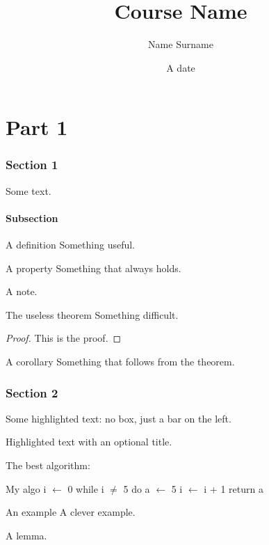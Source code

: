 \documentclass[11pt,a4paper,oneside,openany]{scrbook}
\title{\Huge Course Name}
\author{Name Surname}
\date{A date} %
\begin{document}
\maketitle
\tableofcontents
\clearpage

\part{Part 1}

\section{Section 1}

Some text.

\subsection{Subsection}

\begin{definizione}{A definition}
Something useful.
\end{definizione}

\begin{proprieta}{A property}
Something that always holds.
\end{proprieta}

\begin{nota}
A note.
\end{nota}

\begin{teorema}{The useless theorem}
Something difficult.
\begin{proof}
This is the proof.
\end{proof}

\end{teorema}

\begin{corollario}{A corollary}
Something that follows from the theorem.
\end{corollario}


\section{Section 2}

\begin{evidenzia}
Some highlighted text: no box, just a bar on the left.
\end{evidenzia}

\begin{evidenzia}[A title]
Highlighted text with an optional title.
\end{evidenzia}

The best algorithm:

\begin{algoritmo}{My algo}
i $\gets$ 0
while i $\neq$ 5 do
    a $\gets$ 5
    i $\gets$ i + 1
return a
\end{algoritmo}


\begin{esempio}{An example}
A clever example.
\end{esempio}

\begin{lemma}
A lemma.
\end{lemma}
\end{document}
